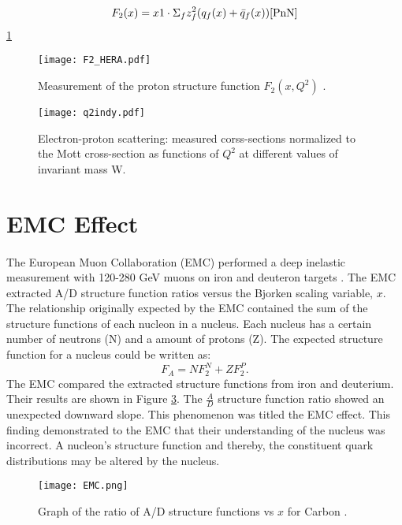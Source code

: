 \begin{equation}
\label{F2q}
F_2(x) = x1 \cdot \Sigma_f z^2_f ( q_f(x) + \bar{q}_f(x))
 \cite{PnN}
\end{equation}
\ref{F2_HERA_fig}

\begin{figure}[]
	\texttt{[image: F2\_HERA.pdf]} 
	\caption{ Measurement of the proton structure function $F_2(x, Q^2)$ \cite{F2_HERA}.}
	\label{F2_HERA_fig}
\end{figure} 

\begin{figure}[]
	\texttt{[image: q2indy.pdf]} 
	\caption{ Electron-proton scattering: measured corss-sections normalized to the Mott cross-section as functions of $Q^2$ at different values of invariant mass W\cite{Q2indy}.}
	\label{q2indy_fig}
\end{figure} 

	\cite{DISearly}
	\cite{DISproton}
	\cite{whitlow_sigma}
	\cite{Q2indy}
	
	
	
\section{EMC Effect}
\paragraph{}The European Muon Collaboration (EMC) performed a deep inelastic measurement with 120-280 GeV muons on iron and deuteron targets \cite{challenge}. The EMC extracted A/D structure function ratios versus the Bjorken scaling variable, $x$.  The relationship originally expected by the EMC contained the sum of the structure functions of each nucleon in a nucleus. Each nucleus has a certain number of neutrons (N) and a amount of protons (Z). The expected structure function for a nucleus could be written as:
\begin{equation}
F_A = N F_2^N + ZF_2^P.
\end{equation}
 The EMC compared the extracted structure functions from iron and deuterium. Their results are shown in Figure \ref{EMCOld}. The $\frac{A}{D}$ structure function ratio showed an unexpected downward slope. This phenomenon was titled the EMC effect. This finding demonstrated to the EMC that their understanding of the nucleus was incorrect. A nucleon's structure function and thereby, the constituent quark distributions may be altered by the nucleus. 
\begin{figure}[h]
\centering
 \caption{ Graph of the ratio of A/D structure functions vs $x$ for Carbon \cite{CC}.}
 \label{EMCOld}
 \texttt{[image: EMC.png]} 
 \end{figure} 


